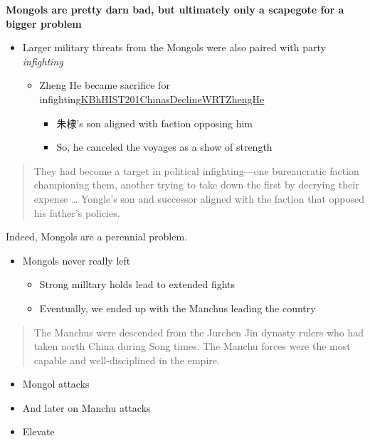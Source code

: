 \documentclass[letterpaper]{article}
\begin{document}
\textbf{Mongols are pretty darn bad, but ultimately only a scapegote for a
bigger problem}

\begin{itemize}
\item Larger military threats from the Mongols were also paired with party
\emph{infighting}

\begin{itemize}
\item Zheng He became sacrifice for
infighting\href{KBhHIST201ChinasDeclineWRTZhengHe.org}{KBhHIST201ChinasDeclineWRTZhengHe}

\begin{itemize}
\item 朱棣's son aligned with faction opposing him
\item So, he canceled the voyages as a show of strength
\end{itemize}
\end{itemize}
\end{itemize}

\begin{quote}
They had become a target in political infighting---one bureaucratic
faction championing them, another trying to take down the first by
decrying their expense \ldots{} Yongle's son and successor aligned with the
faction that opposed his father's policies.
\end{quote}

Indeed, Mongols are a perennial problem.

\begin{itemize}
\item Mongols never really left

\begin{itemize}
\item Strong milltary holds lead to extended fights
\item Eventually, we ended up with the Manchus leading the country
\end{itemize}
\end{itemize}

\begin{quote}
The Manchus were descended from the Jurchen Jin dynasty rulers who had
taken north China during Song times. The Manchu forces were the most
capable and well-disciplined in the empire.
\end{quote}

\begin{itemize}
\item Mongol attacks
\item And later on Manchu attacks
\item Elevate
\end{itemize}
\end{document}
